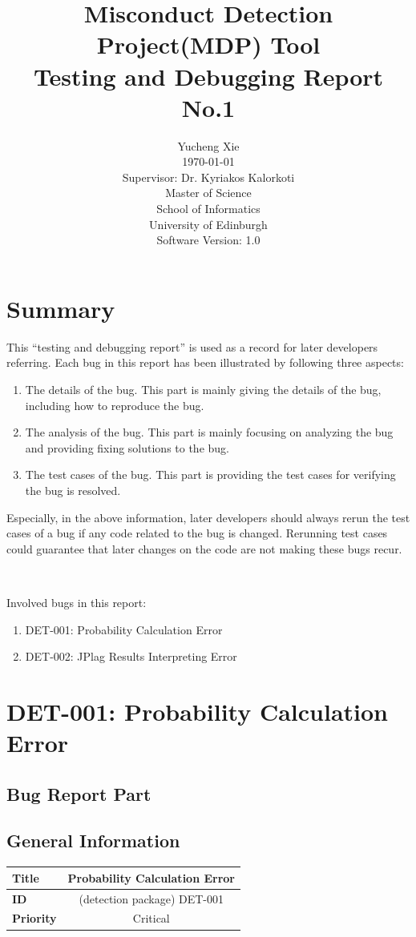 \documentclass[twoside,a4paper]{refart}
\title{Misconduct Detection Project(MDP) Tool\\
Testing and Debugging Report No.1}
\author{Yucheng Xie \\
\today \\
Supervisor: Dr. Kyriakos Kalorkoti\\
Master of Science\\
School of Informatics\\
University of Edinburgh\\
Software Version: 1.0}
\date{}
\newcommand{\bugfirst}{DET-001: Probability Calculation Error}
\newcommand{\bugsecond}{DET-002: JPlag Results Interpreting Error}
\begin{document}
\maketitle

\tableofcontents

\newpage



\section{Summary} \label{sec:intr}
This \enquote{testing and debugging report} is used as a record for later developers referring. Each bug in this report has been illustrated by following three aspects:
\begin{enumerate}
\item The details of the bug. This part is mainly giving the details of the bug, including how to reproduce the bug.
\item The analysis of the bug. This part is mainly focusing on analyzing the bug and providing fixing solutions to the bug.
\item The test cases of the bug. This part is providing the test cases for verifying the bug is resolved.
\end{enumerate}

Especially, in the above information, later developers should always rerun the test cases of a bug if any code related to the bug is changed. Rerunning test cases could guarantee that later changes on the code are not making these bugs recur.

$\ $

Involved bugs in this report:
\begin{enumerate}
\item \bugfirst
\item \bugsecond
\end{enumerate}

\section{\bugfirst} \label{sec:step}
\subsection{Bug Report Part}

\subsection*{General Information}
\begin{table}[!h]
\begin{tabular}{|l|c|}
\hline
\textbf{Title} & Probability Calculation Error \\ \hline
\textbf{ID} & (detection package) DET-001 \\ \hline
\textbf{Priority} & Critical \\ \hline
\end{tabular}
\end{table}
\end{document}
